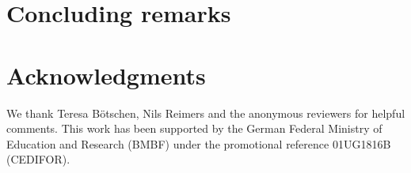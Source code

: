 
%

\section{Concluding remarks}\label{sec:conclusion}


\section*{Acknowledgments}
We thank Teresa B\"otschen, Nils Reimers and the anonymous reviewers for helpful comments.
This work has been supported by the
German Federal Ministry of Education and Research
(BMBF) under the promotional reference
01UG1816B (CEDIFOR).




\appendix





